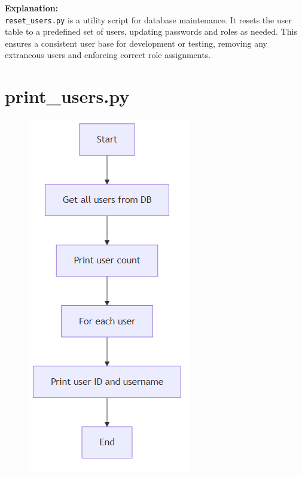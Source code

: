 \documentclass{report}
\begin{document}
\noindent
\textbf{Explanation:} \\
\texttt{reset\_users.py} is a utility script for database maintenance. It resets the user table to a predefined set of users, updating passwords and roles as needed. This ensures a consistent user base for development or testing, removing any extraneous users and enforcing correct role assignments.

\section{print\_users.py}

\begin{figure}[ht]
    \centering
    \includegraphics[width=\textwidth,height=0.8\textheight,keepaspectratio]{png_files/print_users_flow.png}

\end{figure}
\end{document}
